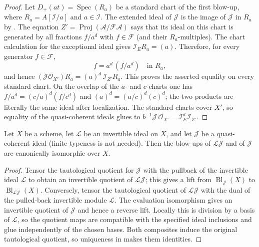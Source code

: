 \begin{proof}
  \leanok
  Let $D_+(at)=\operatorname{Spec}(R_a)$ be a standard chart of the first
  blow-up, where $R_a=A[\mathcal I/a]$ and $a\in\mathcal I$.  The extended
  ideal of $\mathcal J$ is the image of $\mathcal J$ in $R_a$ by
  .  The equation
  $Z'=\operatorname{Proj}(\mathcal A/\mathcal F\mathcal A)$ says that its
  ideal on this chart is generated by all fractions $f/a^d$ with
  $f\in\mathcal F$ (and their $R_a$-multiples).  The chart calculation for
  the exceptional ideal gives $\mathcal I_E R_a=(a)$.  Therefore, for every
  generator $f\in\mathcal F$,
  \[
    f=a^d\,(f/a^d)\quad\text{in }R_a,
  \]
  and hence
  $(\mathcal J\mathcal O_{X'})R_a=(a)^d\,\mathcal I_{Z'}R_a$.
  This proves the asserted equality on every standard chart.  On the overlap
  of the $a$- and $c$-charts one has
  $f/a^d=(c/a)^d(f/c^d)$ and $(a)^d=(a/c)^d(c)^d$; the two products are
  literally the same ideal after localization.  The standard charts cover
  $X'$, so equality of the quasi-coherent ideals glues to
  $b^{-1}\mathcal J\,\mathcal O_{X'}=\mathcal I_E^d\mathcal I_{Z'}$.
\end{proof}

\begin{lemma}
  \label{lemma:nagata-blowup-invertible-factor}
  \leanok

  Let $X$ be a scheme, let $\mathcal L$ be an invertible ideal on $X$, and
  let $\mathcal J$ be a quasi-coherent ideal (finite-typeness is not needed).
  Then the blow-ups of $\mathcal L\mathcal J$ and of $\mathcal J$ are
  canonically isomorphic over $X$.
\end{lemma}

\begin{proof}
  \leanok
  Tensor the tautological quotient for $\mathcal J$ with the pullback of the
  invertible ideal $\mathcal L$ to obtain an invertible quotient of
  $\mathcal L\mathcal J$; this gives a lift from
  $\operatorname{Bl}_{\mathcal J}(X)$ to
  $\operatorname{Bl}_{\mathcal L\mathcal J}(X)$.  Conversely, tensor the
  tautological quotient of $\mathcal L\mathcal J$ with the dual of the
  pulled-back invertible module $\mathcal L$.  The evaluation isomorphism
  gives an invertible quotient of $\mathcal J$ and hence a reverse lift.
  Locally this is division by a basis of $\mathcal L$, so the quotient maps
  are compatible with the specified ideal inclusions and glue independently
  of the chosen bases.  Both composites induce the original tautological
  quotient, so uniqueness in
   makes them identities.
\end{proof}

